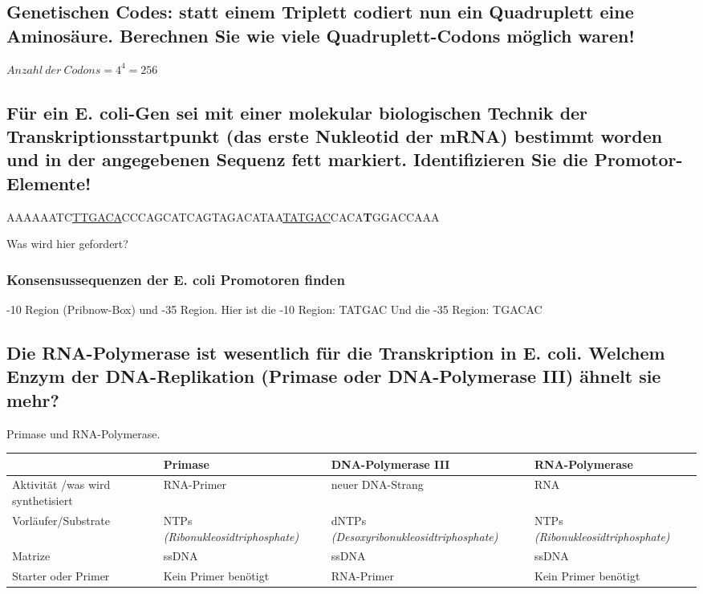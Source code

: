 \documentclass{article}
\begin{document}
\subsection*{Genetischen Codes: statt einem Triplett codiert nun ein Quadruplett eine Aminosäure. Berechnen Sie wie viele
Quadruplett-Codons möglich waren!}
\centerline{$Anzahl\ der\ Codons = 4^4 = 256 $}

\subsection*{Für ein E. coli-Gen sei mit einer molekular biologischen Technik der Transkriptionsstartpunkt (das erste Nukleotid der mRNA) bestimmt worden und in der angegebenen Sequenz fett markiert. Identifizieren Sie die Promotor-Elemente!}
\centerline{AAAAAATC\underline{TTGACA}CCCAGCATCAGTAGACATAA\underline{TATGAC}CACA\textbf{T}GGACCAAA} 
\noindent Was wird hier gefordert? 
\subsubsection*{Konsensussequenzen der E. coli Promotoren finden}
-10 Region (Pribnow-Box) und -35 Region. \newline
Hier ist die -10 Region: TATGAC \newline
Und die -35 Region: TGACAC

\subsection*{Die RNA-Polymerase ist wesentlich für die Transkription in E. coli. Welchem Enzym der DNA-Replikation (Primase oder DNA-Polymerase III) ähnelt sie mehr?}
Primase und RNA-Polymerase. 
\begin{table}[h] 
    \centering
    \begin{tabular}{|p{3cm}||p{4cm}|p{4cm}|p{4cm}|}\hline
         & Primase &  DNA-Polymerase III & RNA-Polymerase\\ \hline \hline
         Aktivität /was wird synthetisiert & \cellcolor{SpringGreen} RNA-Primer  & neuer DNA-Strang & \cellcolor{SpringGreen} RNA \\\hline
         Vorläufer/Substrate & \cellcolor{SpringGreen} NTPs \textit{(Ribonukleosidtriphosphate)} & dNTPs \textit{(Desoxyribonukleosidtriphosphate)}& \cellcolor{SpringGreen} NTPs \textit{(Ribonukleosidtriphosphate)} \\\hline
         Matrize &\cellcolor{SpringGreen} ssDNA & \cellcolor{SpringGreen} ssDNA & \cellcolor{SpringGreen} ssDNA \\\hline
         Starter oder Primer &\cellcolor{SpringGreen} Kein Primer benötigt & RNA-Primer  & \cellcolor{SpringGreen} Kein Primer benötigt \\\hline
    \end{tabular}
    \label{tab:my_label}
\end{table}
\end{document}
